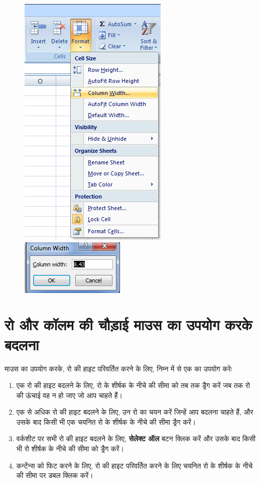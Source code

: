 \begin{figure}[H]
\centering
\includegraphics[scale=.75]{src/images/chapter2/chapter2_fig12.png}\qquad
\includegraphics[scale=.75]{src/images/chapter2/chapter2_fig13.png}
\end{figure}

\section{रो और कॉलम की चौड़ाई माउस का उपयोग करके बदलना}\label{id-2.6}

माउस का उपयोग करके, रो की हाइट परिवर्तित करने के लिए, निम्न में से एक का उपयोग करेः
\begin{enumerate}
\renewcommand{\labelenumi}{\theenumi)}
\item एक रो की हाइट बदलने के लिए, रो के शीर्षक के नीचे की सीमा को तब तक ड्रैग करें जब तक रो की ऊंचाई वह न हो जाए जो आप चाहते हैं।
\item एक से अधिक रो की हाइट बदलने के लिए, उन रो का चयन करें जिन्हें आप बदलना चाहते हैं, और उसके बाद किसी भी एक चयनित रो के शीर्षक के नीचे की सीमा ड्रैग करें।

\newpage

\item वर्कशीट पर सभी रो की हाइट बदलने के लिए, \textbf{सेलेक्ट ऑल} बटन क्लिक करें और उसके बाद किसी भी रो शीर्षक के नीचे की सीमा को ड्रैग करें।
\item कन्टेंन्स को फिट करने के लिए, रो की हाइट परिवर्तित करने के लिए चयनित रो के शीर्षक के नीचे की सीमा पर डबल क्लिक करें।
\end{enumerate}

